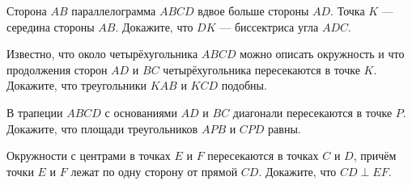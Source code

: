 \begin{consultation}
	\begin{listofex}
		\item Сторона \( AB \) параллелограмма \( ABCD \) вдвое больше стороны \( AD \). Точка \( K \) --- середина стороны \( AB \). Докажите, что \( DK \) --- биссектриса угла \( ADC \).
		\item Известно, что около четырёхугольника \( ABCD \) можно описать окружность и что продолжения сторон \( AD \) и \( BC \) четырёхугольника пересекаются в точке \( K \). Докажите, что треугольники \( KAB \) и \( KCD \) подобны.
		\item В трапеции \( ABCD \) с основаниями \( AD \) и \( BC \) диагонали пересекаются в точке \( P \). Докажите, что площади треугольников \( APB \) и \( CPD \) равны.
		\item Окружности с центрами в точках \( E \) и \( F \) пересекаются в точках \( C \) и \( D \), причём точки \( E \) и \( F \) лежат по одну сторону от  прямой \( CD \). Докажите, что \( CD\perp EF \).
	\end{listofex}
\end{consultation}
